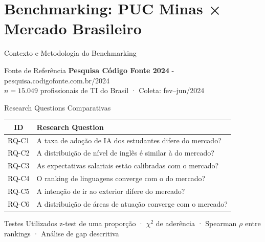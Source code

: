 \documentclass[fleqn]{beamer}
\begin{document}
\section{Benchmarking: PUC Minas × Mercado Brasileiro}

\begin{frame}{Contexto e Metodologia do Benchmarking}
\begin{block}{Fonte de Referência}
\textbf{Pesquisa Código Fonte 2024} - pesquisa.codigofonte.com.br/2024\\
$n = 15.049$ profissionais de TI do Brasil · Coleta: fev–jun/2024
\end{block}

\begin{block}{Research Questions Comparativas}
\scriptsize
\begin{tabular}{cl}
\toprule
\textbf{ID} & \textbf{Research Question} \\
\midrule
RQ-C1 & A taxa de adoção de IA dos estudantes difere do mercado? \\
RQ-C2 & A distribuição de nível de inglês é similar à do mercado? \\
RQ-C3 & As expectativas salariais estão calibradas com o mercado? \\
RQ-C4 & O ranking de linguagens converge com o do mercado? \\
RQ-C5 & A intenção de ir ao exterior difere do mercado? \\
RQ-C6 & A distribuição de áreas de atuação converge com o mercado? \\
\bottomrule
\end{tabular}
\end{block}

\begin{block}{Testes Utilizados}
\scriptsize
z-test de uma proporção · $\chi^2$ de aderência · Spearman $\rho$ entre rankings · Análise de gap descritiva
\end{block}
\end{frame}
\end{document}
